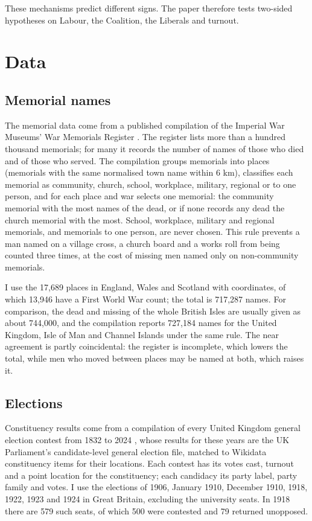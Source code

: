 \documentclass[11pt,a4paper]{article}
\begin{document}
These mechanisms predict different signs. The paper therefore tests two-sided hypotheses on Labour, the Coalition, the Liberals and turnout.

\section{Data}\label{sec:data}
\subsection{Memorial names}
The memorial data come from a published compilation of the Imperial War Museums' War Memorials Register \citep{iwm,hotham2026wm}. The register lists more than a hundred thousand memorials; for many it records the number of names of those who died and of those who served. The compilation groups memorials into places (memorials with the same normalised town name within 6 km), classifies each memorial as community, church, school, workplace, military, regional or to one person, and for each place and war selects one memorial: the community memorial with the most names of the dead, or if none records any dead the church memorial with the most. School, workplace, military and regional memorials, and memorials to one person, are never chosen. This rule prevents a man named on a village cross, a church board and a works roll from being counted three times, at the cost of missing men named only on non-community memorials.

I use the 17,689 places in England, Wales and Scotland with coordinates, of which 13,946 have a First World War count; the total is 717,287 names. For comparison, the dead and missing of the whole British Isles are usually given as about 744,000, and the compilation reports 727,184 names for the United Kingdom, Isle of Man and Channel Islands under the same rule. The near agreement is partly coincidental: the register is incomplete, which lowers the total, while men who moved between places may be named at both, which raises it.

\subsection{Elections}
Constituency results come from a compilation of every United Kingdom general election contest from 1832 to 2024 \citep{hotham2026el}, whose results for these years are the UK Parliament's candidate-level general election file, matched to Wikidata constituency items for their locations. Each contest has its votes cast, turnout and a point location for the constituency; each candidacy its party label, party family and votes. I use the elections of 1906, January 1910, December 1910, 1918, 1922, 1923 and 1924 in Great Britain, excluding the university seats. In 1918 there are 579 such seats, of which 500 were contested and 79 returned unopposed.
\end{document}
